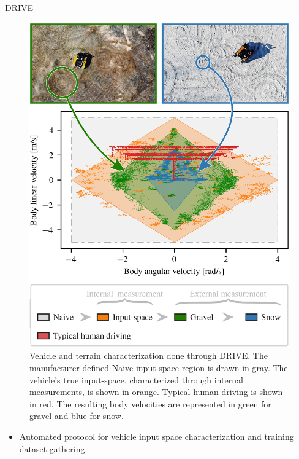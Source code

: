 \documentclass[final,hyperref={pdfpagelabels=false}]{beamer}
\begin{document}
\begin{frame}[t]
\begin{columns}[t]
\begin{column}{.465\textwidth}
\begin{block}{\acf{DRIVE}}
	\begin{figure}
		\includegraphics[width=0.785\linewidth]{figures/Figure_1_final_no_margin.pdf}%
		\vspace{-7mm}
		\caption{
			Vehicle and terrain characterization done through DRIVE.
			The manufacturer-defined Naive input-space region is drawn in gray.
			The vehicle's true input-space, characterized through internal measurements, is shown in orange.
			Typical human driving is shown in red.
			The resulting body velocities are represented in green for gravel and blue for snow.
		}
		\label{fig:simu}
	\end{figure}
		\begin{itemize}
		\item Automated protocol for vehicle input space characterization and training dataset gathering.

\end{itemize}
\end{block}
\end{column}
\end{columns}
\end{frame}
\end{document}
